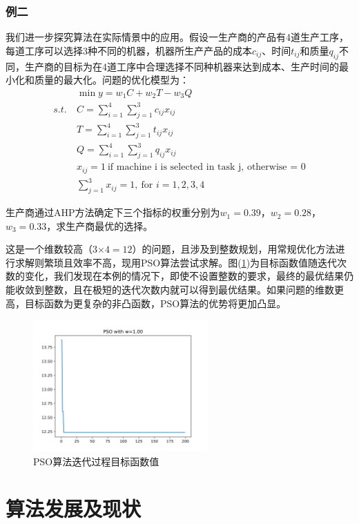 \documentclass[lang=cn,12pt,a4paper,cite=authoryear]{elegantpaper}
\begin{document}
\subsubsection{例二}

我们进一步探究算法在实际情景中的应用。假设一生产商的产品有4道生产工序，每道工序可以选择3种不同的机器，机器所生产产品的成本$c_{ij}$、时间$t_{ij}$和质量$q_{ij}$不同，生产商的目标为在4道工序中合理选择不同种机器来达到成本、生产时间的最小化和质量的最大化。问题的优化模型为：
\begin{align*}
& \min y = w_1C + w_2T - w_3Q\\
s.t.\ & C = \sum_{i=1}^{4}\sum_{j=1}^{3} c_{ij}x_{ij}\\
& T = \sum_{i=1}^{4}\sum_{j=1}^{3} t_{ij}x_{ij}\\
& Q = \sum_{i=1}^{4}\sum_{j=1}^{3} q_{ij}x_{ij}\\
& x_{ij} = 1\ \text{if machine i is selected in task j, otherwise = 0}\\
& \sum_{j=1}^{3} x_{ij} = 1, \ \text{for } i = 1,2,3,4
\end{align*}

生产商通过AHP方法确定下三个指标的权重分别为$w_1 = 0.39$，$w_2=0.28$，$w_3=0.33$，求生产商最优的选择。

这是一个维数较高（3$\times 4=12$）的问题，且涉及到整数规划，用常规优化方法进行求解则繁琐且效率不高，现用PSO算法尝试求解。图(\ref{fig3})为目标函数值随迭代次数的变化，我们发现在本例的情况下，即使不设置整数的要求，最终的最优结果仍能收敛到整数，且在极短的迭代次数内就可以得到最优结果。如果问题的维数更高，目标函数为更复杂的非凸函数，PSO算法的优势将更加凸显。

\begin{figure}[H]
	\centering
	\includegraphics[width=0.6\textwidth]{image/fig2.png}
	\caption{PSO算法迭代过程目标函数值}
	\label{fig3}
\end{figure}

\section{算法发展及现状}
\end{document}
